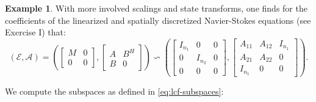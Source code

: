 \documentclass[]{book}
\theoremstyle{definition}
\theoremstyle{definition}
\newtheorem{example}{Example}[chapter]
\theoremstyle{definition}
\theoremstyle{definition}
\theoremstyle{remark}
\begin{document}
\begin{example}
\protect\hypertarget{exm:strangeness-in-the-nse}{}{\label{exm:strangeness-in-the-nse} }With more involved scalings and state transforms, one finds for the coefficients of the linearized and spatially discretized Navier-Stokes equations (see Exercise I) that:
\[
(\mathcal E, \mathcal A) =
\left(
\begin{bmatrix} M & 0 \\ 0 & 0 \end{bmatrix}
,
\begin{bmatrix} A & B^H \\ B & 0 \end{bmatrix}
\right)
\backsim 
\left(
\begin{bmatrix} I_{n_1} & 0 & 0 \\ 0 & I_{n_2} & 0 \\ 0 & 0 & 0\end{bmatrix}
,
\begin{bmatrix} A_{11} & A_{12} & I_{n_1} \\ A_{21} & A_{22} & 0 \\ I_{n_1} & 0 & 0\end{bmatrix}
\right).
\]

We compute the subspaces as defined in \eqref{eq:lcf-subspaces}:


\end{example}
\end{document}
